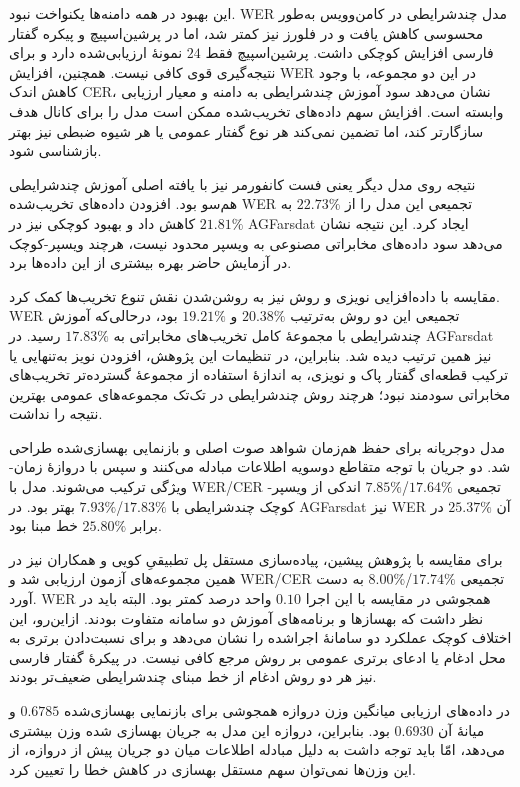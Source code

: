 این بهبود در همه دامنه‌ها یکنواخت نبود. WER مدل چندشرایطی در کامن‌وویس به‌طور محسوسی کاهش یافت و در فلورز نیز کمتر شد، اما در پرشین‌اسپیچ و پیکره گفتار فارسی افزایش کوچکی داشت. پرشین‌اسپیچ فقط $24$ نمونهٔ ارزیابی‌شده دارد و برای نتیجه‌گیری قوی کافی نیست. همچنین، افزایش WER در این دو مجموعه، با وجود کاهش اندک CER، نشان می‌دهد سود آموزش چندشرایطی به دامنه و معیار ارزیابی وابسته است. افزایش سهم داده‌های تخریب‌شده ممکن است مدل را برای کانال هدف سازگارتر کند، اما تضمین نمی‌کند هر نوع گفتار عمومی یا هر شیوه ضبطی نیز بهتر بازشناسی شود.

نتیجه روی مدل دیگر یعنی فست کانفورمر نیز با یافته اصلی آموزش چندشرایطی هم‌سو بود. افزودن داده‌های تخریب‌شده WER تجمیعی این مدل را از $22.73\%$ به $21.81\%$ کاهش داد و بهبود کوچکی نیز در AGFarsdat ایجاد کرد. این نتیجه نشان می‌دهد سود داده‌های مخابراتی مصنوعی به ویسپر محدود نیست، هرچند ویسپر-کوچک در آزمایش حاضر بهره بیشتری از این داده‌ها برد.

مقایسه با داده‌افزایی نویزی و روش  نیز به روشن‌شدن نقش تنوع تخریب‌ها کمک کرد. WER تجمیعی این دو روش به‌ترتیب $20.38\%$ و $19.21\%$ بود، درحالی‌که آموزش چندشرایطی با مجموعهٔ کامل تخریب‌های مخابراتی به $17.83\%$ رسید. در AGFarsdat نیز همین ترتیب دیده شد. بنابراین، در تنظیمات این پژوهش، افزودن نویز به‌تنهایی یا ترکیب قطعه‌ای گفتار پاک و نویزی، به اندازهٔ استفاده از مجموعهٔ گسترده‌تر تخریب‌های مخابراتی سودمند نبود؛ هرچند روش چندشرایطی در تک‌تک مجموعه‌های عمومی بهترین نتیجه را نداشت.


مدل دوجریانه برای حفظ هم‌زمان شواهد صوت اصلی و بازنمایی بهسازی‌شده طراحی شد. دو جریان با توجه متقاطع دوسویه اطلاعات مبادله می‌کنند و سپس با دروازهٔ زمان-ویژگی ترکیب می‌شوند. مدل با WER/CER تجمیعی $17.64\%$/$7.85\%$ اندکی از ویسپر-کوچک چندشرایطی با $17.83\%$/$7.93\%$ بهتر بود. در AGFarsdat نیز WER آن $25.37\%$ در برابر $25.80\%$ خط مبنا بود.

برای مقایسه با پژوهش پیشین، پیاده‌سازی مستقل پل تطبیقیِ کویی و همکاران  نیز در همین مجموعه‌های آزمون ارزیابی شد و WER/CER تجمیعی $17.74\%$/$8.00\%$ به دست آورد. WER همجوشی در مقایسه با این اجرا $0.10$ واحد درصد کمتر بود. البته باید در نظر داشت که بهسازها و برنامه‌های آموزش دو سامانه متفاوت بودند. ازاین‌رو، این اختلاف کوچک عملکرد دو سامانهٔ اجراشده را نشان می‌دهد و برای نسبت‌دادن برتری به محل ادغام یا ادعای برتری عمومی بر روش مرجع کافی نیست. در پیکرهٔ گفتار فارسی نیز هر دو روش ادغام از خط مبنای چندشرایطی ضعیف‌تر بودند.

در داده‌های ارزیابی میانگین وزن دروازه همجوشی برای بازنمایی بهسازی‌شده $0.6785$ و میانهٔ آن $0.6930$ بود. بنابراین، دروازه این مدل به جریان بهسازی شده وزن بیشتری می‌دهد، امّا باید توجه داشت به دلیل مبادله اطلاعات میان دو جریان پیش از دروازه، از این وزن‌ها نمی‌توان سهم مستقل بهسازی در کاهش خطا را تعیین کرد.

